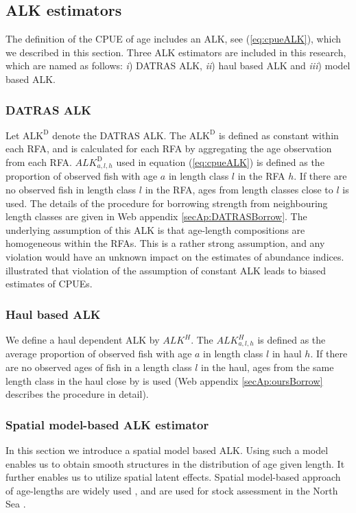\documentclass[a4paper 12pt]{article}
\numberwithin{equation}{section}
\begin{document}
\subsection{ALK estimators}
\label{sec:alkmethods}

The definition of the CPUE of age includes an ALK, see (\ref{eq:cpueALK}), which we described in this section. Three ALK estimators are included in this research, which are named as follows:  \textit{i}) DATRAS ALK, \textit{ii}) haul based ALK and \textit{iii}) model based ALK.
\subsubsection{DATRAS ALK}
\label{sec:datrasalkestimator}
Let $\text{ALK}^{\text{D}}$ denote the DATRAS ALK. The $\text{ALK}^{\text{D}}$ is defined as constant within each RFA, and is calculated for each RFA by aggregating the age observation from each RFA. $ALK^{\text{D}}_{a,l,h}$ used in equation (\ref{eq:cpueALK}) is defined as the proportion of observed fish with age $a$ in length class $l$ in the RFA $h$. If there are no observed fish in length class $l$ in the RFA, ages from length classes close to $l$ is used. The details of the procedure for borrowing strength from neighbouring length classes are given in Web appendix \ref{secAp:DATRASBorrow}. The underlying assumption of this ALK  is that age-length compositions are homogeneous within the RFAs. This is a rather strong assumption, and any violation would have an unknown impact on the estimates of abundance indices. \citet{aanes2015efficient} illustrated that violation of the assumption of constant ALK leads to biased estimates of CPUEs. 

\subsubsection{Haul based ALK}
\label{sec:haulestimator}
We define a haul dependent ALK  by  $ALK^{H}$. The $ALK^{H}_{a,l,h}$ is defined as the average proportion of observed fish with age $a$ in  length class $l$ in haul $h$. If there are no observed ages of fish in a length class $l$ in the haul, ages from the same length class in the haul close by is used (Web appendix \ref{secAp:oursBorrow} describes the procedure in detail).

\subsubsection{Spatial model-based ALK estimator}
\label{sec:spatialModelALK}
In this section we introduce a spatial model based ALK. Using such a model enables us to obtain smooth structures in the distribution of age given length. It further enables us to utilize spatial latent effects. Spatial model-based approach of age-lengths are widely used \citep{berg2012spatial, hirst2012bayesian, rindorf2001analyses}, and are used for stock assessment in the North Sea \citep{berg2014evaluation}. \\ %
\end{document}
